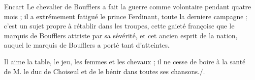 \begin{diary}{Encart}{}
                              Le chevalier de
                                 Boufflers a fait la
                              guerre comme volontaire pendant quatre
                              mois ; il a extrémement fatigué le
                                 prince Ferdinant, toute la derniere
                              campagne ; c'est un sujet propre à
                              rétablir dans les troupes, cette gaieté
                              françoise que le marquis de Boufflers
                              attriste par sa sévérité, et cet ancien
                              esprit de la nation, auquel le
                                 marquis
                                 de Boufflers a porté tant d'atteintes. \bigskip

         Il aime la table, le jeu, les femmes et les
                              chevaux ; il ne cesse de boire à la santé
                              de M. le duc de Choiseul et
                              de le bénir
                              dans toutes ses chansons./.
                           \bigskip

        \end{diary}



